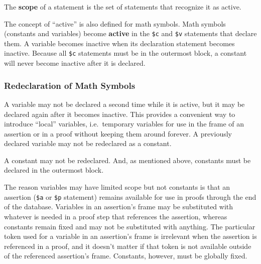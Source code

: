 The {\bf scope} of a statement is the set of statements that
recognize it as active.


The concept of ``active'' is also defined for math symbols.  Math symbols (constants and
variables) become {\bf active}
in the \texttt{\$c} and
\texttt{\$v} statements that declare them.
A variable becomes inactive when its declaration statement becomes
inactive.  Because all \texttt{\$c} statements must be in the outermost
block, a constant will never become inactive after it is declared.

\subsubsection{Redeclaration of Math Symbols}
\label{redeclaration}


A variable may not be declared a second time while it is active, but it may be
declared again after it becomes inactive.  This provides a convenient way to
introduce ``local'' variables, i.e.\ temporary variables
for use in the frame of an assertion or in a proof without keeping them around
forever.  A previously declared variable may not be redeclared as a constant.

A constant may not be redeclared.  And, as mentioned above, constants must be
declared in the outermost block.

The reason variables may have limited scope but not constants is that an
assertion (\texttt{\$a} or \texttt{\$p} statement) remains available for use in
proofs through the end of the database.  Variables in an assertion's frame may
be substituted with whatever is needed in a proof step that references the
assertion, whereas constants remain fixed and may not be substituted with
anything.  The particular token used for a variable in an assertion's frame is
irrelevant when the assertion is referenced in a proof, and it doesn't matter
if that token is not available outside of the referenced assertion's frame.
Constants, however, must be globally fixed.

